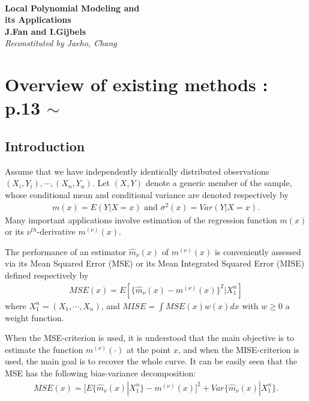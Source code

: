 \documentclass[12pt]{article}
\renewcommand{\=}[1]{\stackrel{#1}{=}} %
\theoremstyle{definition}
\begin{document}
	{\noindent\Huge\bf  \\[0.5\baselineskip] {\selectfont  
			Local Polynomial Modeling and \\its Applications
		}}
	\\[2\baselineskip] %
	{{\bf {}\selectfont J.Fan and I.Gijbels}\\ {\textit{\selectfont Reconstituted by Jaeho, Chang}}}
		
	\tableofcontents
	\newpage
		
	\section{Overview of existing methods : p.13 $\sim$}
	\subsection{Introduction}
		Assume that we have independently identically distributed observations $( X_i , Y_i ) , \cdots , ( X_n , Y_n)$. Let $( X , Y )$ denote a generic member of the sample, whose conditional mean and conditional variance are denoted respectively by
		\begin{align}
		m(x)=E(Y|X=x)\text{ and }\sigma^2(x)=Var(Y|X=x).
		\end{align}
		Many important applications involve estimation of the regression function $m(x)$ or its $\nu^{th}$-derivative $m^{(\nu)}(x)$.
		
		The performance of an estimator $\hat{m}_{\nu}(x)$ of $m^{(\nu)}(x)$ is conveniently assessed via its Mean Squared Error (MSE) or its Mean Integrated Squared Error (MISE) defined respectively by
		\begin{align}
		MSE(x)=E[\{ \hat{m}_{\nu}(x)-m^{(\nu)}(x) \}^2|X_1^n]
		\end{align}
		where $X_1^n=(X_1,\cdots,X_n)$, and $MISE=\int MSE(x)w(x)dx$ with $w\geq0$ a weight function.
		
		When the MSE-criterion is used, it is understood that the main objective is to estimate the function $m^{(\nu)}(\cdot)$ at the point $x$, and when the MISE-criterion is used, the main goal is to recover the whole curve. It can be easily seen that the MSE has the following bias-variance decomposition:
		\begin{align}
		MSE(x)=[E\{\hat{m}_{\nu}(x)|X_1^n\}-m^{(\nu)}(x)]^2+Var\{\hat{m}_{\nu}(x)|X_1^n\}.
		\end{align}
\end{document}
